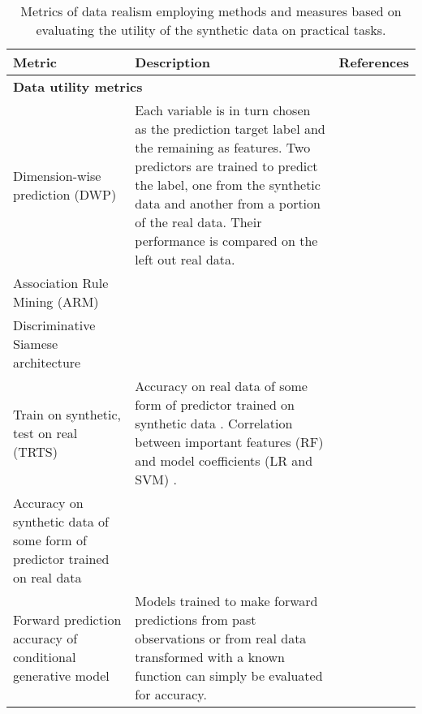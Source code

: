\begin{table}
        
        
        \caption{Metrics of data realism employing methods and measures based on evaluating the utility of the synthetic data on practical tasks.}\label{tab:aug-metrics}
        
        \begin{tabular}{@{} p{} p{} p{} @{}} \toprule
        Metric & Description & References\\ \midrule
        
        \multicolumn{3}{Y}{\textbf{Data utility metrics}}\\ \midrule
        
        Dimension-wise prediction (DWP) & Each variable is in turn chosen as the prediction target label and the remaining as features. Two predictors are trained to predict the label, one from the synthetic data and another from a portion of the real data. Their performance is compared on the left out real data.  & \cite{choi2017generating,Camino2018-re,Goncalves2020,yan2020generating}\\[20pt]
        
        Association Rule Mining (ARM) & & \cite{Baowaly2019,Bae2020,yan2020generating}\\[20pt]
        
        Discriminative Siamese architecture & & \cite{torfi2019generating}\\[20pt]
        
        Train on synthetic, test on real (TRTS) & Accuracy on real data of some form of predictor trained on synthetic data \cite{Beaulieu-Jones2019-ct}. Correlation between important features (RF) and model coefficients (LR and SVM) \cite{Beaulieu-Jones2019-ct}. & \cite{esteban2017real,Xu2019-ay,Yoon2018-dm,chin2019generation}\\
        
        Accuracy on synthetic data of some form of predictor trained on real data & & \cite{Bae2020}\\
        
        Forward prediction accuracy of conditional generative model &
        Models trained to make forward predictions from past observations or from real data transformed with a known function can simply be evaluated for accuracy. & \cite{Xiao2018-aj,mcdermott2018semi,yoon2018gain,Yang_2019b}\\
        


\end{tabular}
\end{table}
